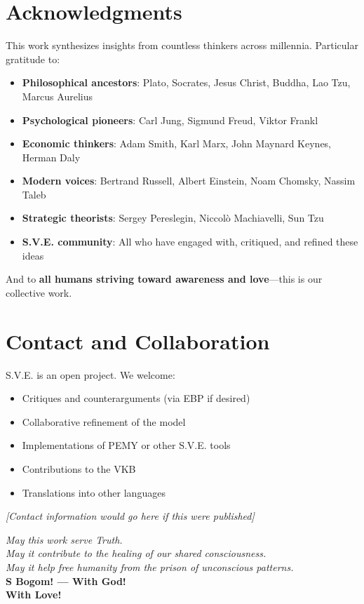 \documentclass[11pt,a4paper]{article}
\theoremstyle{definition}
\theoremstyle{remark}
\begin{document}
\section{Acknowledgments}

This work synthesizes insights from countless thinkers across millennia. Particular gratitude to:

\begin{itemize}
\item \textbf{Philosophical ancestors}: Plato, Socrates, Jesus Christ, Buddha, Lao Tzu, Marcus Aurelius
\item \textbf{Psychological pioneers}: Carl Jung, Sigmund Freud, Viktor Frankl
\item \textbf{Economic thinkers}: Adam Smith, Karl Marx, John Maynard Keynes, Herman Daly
\item \textbf{Modern voices}: Bertrand Russell, Albert Einstein, Noam Chomsky, Nassim Taleb
\item \textbf{Strategic theorists}: Sergey Pereslegin, Niccolò Machiavelli, Sun Tzu
\item \textbf{S.V.E. community}: All who have engaged with, critiqued, and refined these ideas
\end{itemize}

And to \textbf{all humans striving toward awareness and love}—this is our collective work.

\section{Contact and Collaboration}

S.V.E. is an open project. We welcome:
\begin{itemize}
\item Critiques and counterarguments (via EBP if desired)
\item Collaborative refinement of the model
\item Implementations of PEMY or other S.V.E. tools
\item Contributions to the VKB
\item Translations into other languages
\end{itemize}

\textit{[Contact information would go here if this were published]}

\vspace{2cm}

\begin{center}
\textit{May this work serve Truth.} \\
\textit{May it contribute to the healing of our shared consciousness.} \\
\textit{May it help free humanity from the prison of unconscious patterns.} \\[0.5cm]

\textbf{S Bogom! — With God!} \\

\textbf{With Love!}
\end{center}
\end{document}
